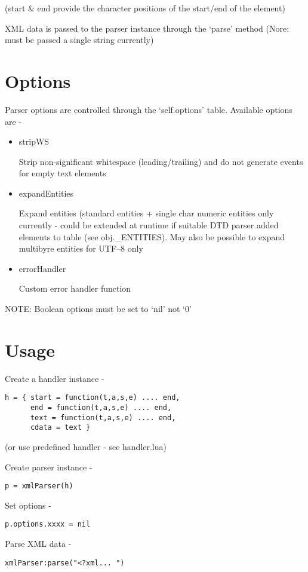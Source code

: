 \documentclass{ltxdoc}
\begin{document}
(start \& end provide the character positions of the start/end of the
element)

XML data is passed to the parser instance through the `parse' method
(Nore: must be passed a single string currently)

\section{Options}

Parser options are controlled through the `self.options' table.
Available options are -

\begin{itemize}
\item
  stripWS

  Strip non-significant whitespace (leading/trailing) and do not
  generate events for empty text elements
\item
  expandEntities

  Expand entities (standard entities + single char numeric entities only
  currently - could be extended at runtime if suitable DTD parser added
  elements to table (see obj.\_ENTITIES). May also be possible to expand
  multibyre entities for UTF--8 only
\item
  errorHandler

  Custom error handler function
\end{itemize}
NOTE: Boolean options must be set to `nil' not `0'

\section{Usage}

Create a handler instance -

\begin{verbatim}
h = { start = function(t,a,s,e) .... end,
      end = function(t,a,s,e) .... end,
      text = function(t,a,s,e) .... end,
      cdata = text }
\end{verbatim}
(or use predefined handler - see handler.lua)

Create parser instance -

\begin{verbatim}
p = xmlParser(h)
\end{verbatim}
Set options -

\begin{verbatim}
p.options.xxxx = nil
\end{verbatim}
Parse XML data -

\begin{verbatim}
xmlParser:parse("<?xml... ")
\end{verbatim}
\end{document}
